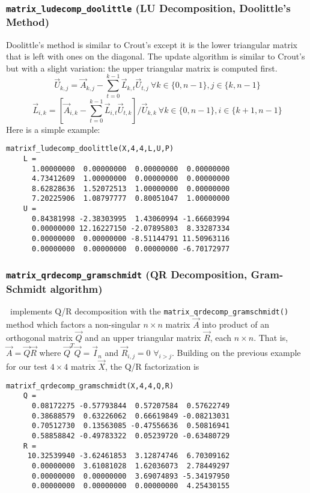 \subsubsection{{\tt matrix\_ludecomp\_doolittle} (LU Decomposition, Doolittle's Method)}
\label{module:matrix:ludecomp_doolittle}
Doolittle's method is similar to Crout's except it is the lower triangular
matrix that is left with ones on the diagonal.
The update algorithm is similar to Crout's but with a slight variation: the
upper triangular matrix is computed first.
%
\[
    \vec{U}_{k,j} = \vec{A}_{k,j} -
                    \sum_{t=0}^{k-1}{ \vec{L}_{k,t} \vec{U}_{t,j} }
                    \ \forall k \in \{0,n-1\}, j \in \{k,n-1\}
\]
%
\[
    \vec{L}_{i,k} = \left[
                        \vec{A}_{i,k} -
                        \sum_{t=0}^{k-1}{ \vec{L}_{i,t} \vec{U}_{t,k} }
                    \right] / \vec{U}_{k,k}
                    \ \forall k \in \{0,n-1\}, i \in \{k+1,n-1\}
\]
%
Here is a simple example:
\begin{Verbatim}[fontsize=\small]
    matrixf_ludecomp_doolittle(X,4,4,L,U,P)
    L =
      1.00000000  0.00000000  0.00000000  0.00000000
      4.73412609  1.00000000  0.00000000  0.00000000
      8.62828636  1.52072513  1.00000000  0.00000000
      7.20225906  1.08797777  0.80051047  1.00000000
    U =
      0.84381998 -2.38303995  1.43060994 -1.66603994
      0.00000000 12.16227150 -2.07895803  8.33287334
      0.00000000  0.00000000 -8.51144791 11.50963116
      0.00000000  0.00000000  0.00000000 -6.70172977
\end{Verbatim}

\subsubsection{{\tt matrix\_qrdecomp\_gramschmidt}
               (QR Decomposition, Gram-Schmidt algorithm)}
\label{module:matrix:qrdecomp_gramschmidt}
\liquid\ implements Q/R decomposition with the
{\tt matrix\_qrdecomp\_gramschmidt()} method which factors
a non-singular $n \times n$ matrix $\vec{A}$ into
product of an orthogonal matrix $\vec{Q}$ and an upper triangular matrix
$\vec{R}$, each $n \times n$.
That is, $\vec{A} = \vec{Q}\vec{R}$ where
$\vec{Q}^T\vec{Q} = \vec{I}_n$ and
$\vec{R}_{i,j} = 0\,\, \forall_{i > j}$.
%
Building on the previous example for our test $4 \times 4$ matrix
$\vec{X}$, the Q/R factorization is
%
\begin{Verbatim}[fontsize=\small]
    matrixf_qrdecomp_gramschmidt(X,4,4,Q,R)
    Q =
      0.08172275 -0.57793844  0.57207584  0.57622749
      0.38688579  0.63226062  0.66619849 -0.08213031
      0.70512730  0.13563085 -0.47556636  0.50816941
      0.58858842 -0.49783322  0.05239720 -0.63480729
    R =
     10.32539940 -3.62461853  3.12874746  6.70309162
      0.00000000  3.61081028  1.62036073  2.78449297
      0.00000000  0.00000000  3.69074893 -5.34197950
      0.00000000  0.00000000  0.00000000  4.25430155
\end{Verbatim}

